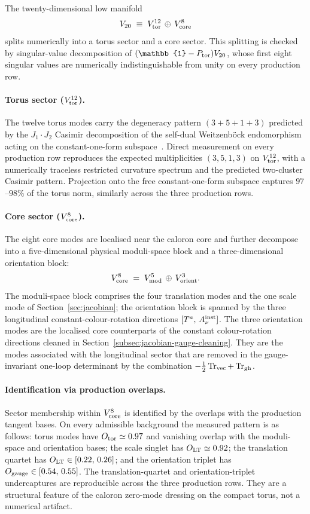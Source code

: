 \documentclass[a4paper,11pt]{article}
\theoremstyle{definition}
\newcommand{\Tr}{\mathop{\rm Tr}}
\begin{document}
The twenty-dimensional low manifold
\[
V_{20} \;\equiv\; V_{\rm tor}^{12} \,\oplus\, V_{\rm core}^{8}
\]
splits numerically into a torus sector and a core sector. This
splitting is checked by singular-value decomposition of
$(\mathbb{1} - P_{\rm tor})V_{20}$, whose first eight singular values
are numerically indistinguishable from unity on every production
row.

\paragraph{Torus sector ($V_{\rm tor}^{12}$).}
The twelve torus modes carry the degeneracy pattern $(3+5+1+3)$
predicted by the $J_1 \!\cdot\! J_2$ Casimir decomposition of the
self-dual Weitzenb\"ock endomorphism acting on the constant-one-form
subspace~\cite{companion-structural}. Direct measurement on every
production row reproduces the expected multiplicities $(3, 5, 1, 3)$
on $V_{\rm tor}^{12}$, with a numerically traceless restricted
curvature spectrum and the predicted two-cluster Casimir pattern.
Projection onto the free constant-one-form subspace captures
$97$--$98\%$ of the torus norm, similarly across the three
production rows.

\paragraph{Core sector ($V_{\rm core}^{8}$).}
The eight core modes are localised near the caloron core and
further decompose into a five-dimensional physical moduli-space
block and a three-dimensional orientation block:
\[
V_{\rm core}^{8}
\;=\;
V_{\rm mod}^{5}
\,\oplus\,
V_{\rm orient}^{3}.
\]
The moduli-space block comprises the four translation modes and the
one scale mode of Section~\ref{sec:jacobian}; the orientation block
is spanned by the three longitudinal constant-colour-rotation
directions $[T^a,\,A_\nu^{\rm inst}]$. The three orientation modes
are the localised core counterparts of the constant colour-rotation
directions cleaned in Section~\ref{subsec:jacobian-gauge-cleaning}. They
are the modes associated with the longitudinal sector that are
removed in the gauge-invariant one-loop determinant by the
combination $-\tfrac{1}{2}\Tr_{\rm vec} + \Tr_{\rm gh}$.

\paragraph{Identification via production overlaps.}
Sector membership within $V_{\rm core}^{8}$ is identified by the
overlaps with the production tangent bases. On every admissible
background the measured pattern is as follows: torus modes have
$O_{\rm tor} \simeq 0.97$ and vanishing overlap with the
moduli-space and orientation bases; the scale singlet has
$O_{\rm LT} \simeq 0.92$; the translation quartet has
$O_{\rm LT} \in [0.22,\,0.26]$; and the orientation triplet has
$O_{\rm gauge} \in [0.54,\,0.55]$. The translation-quartet and
orientation-triplet undercaptures are reproducible across the three
production rows. They are a structural feature of the caloron
zero-mode dressing on the compact torus, not a numerical artifact.
\end{document}
